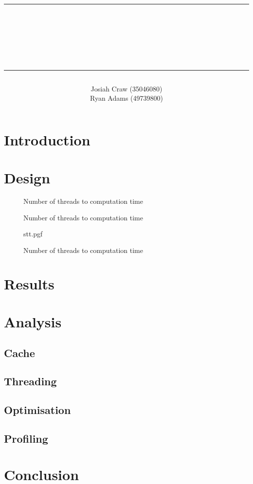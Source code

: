 \documentclass[12pt]{article}
\author{\LARGE Josiah Craw (35046080)\vspace{1cm}\\\LARGE Ryan Adams (49739800)\vspace{1cm}\\}
\title{\rule{\textwidth}{0.8pt} \\ {\huge \textbf{\reportTitle}}\\{\large \subTitle} \rule{\textwidth}{0.8pt}}
\begin{document}
\maketitle
\thispagestyle{empty}
\newpage

\setcounter{page}{1}
\section{Introduction}

\section{Design}

\begin{figure}[H]
    \centering
    
    \caption{Number of threads to computation time}
\end{figure}

\begin{figure}[H]
    \centering
    
    \caption{Number of threads to computation time}
\end{figure}

\begin{figure}[H]
    \centering
    {stt.pgf}
    \caption{Number of threads to computation time}
\end{figure}

\section{Results}

\section{Analysis}

\subsection{Cache}

\subsection{Threading}

\subsection{Optimisation}

\subsection{Profiling}

\section{Conclusion}

\newpage
\medskip


\end{document}
